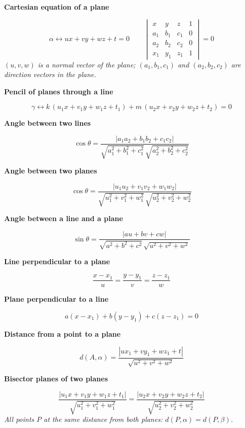 \documentclass[11pt]{article}
\newcommand{\sub}[1]{\par\medskip\textbf{#1}\par}
\newcommand{\expl}[1]{{\color{gray}\itshape #1}\par}
\begin{document}
\sub{Cartesian equation of a plane}
\[ \alpha \leftrightarrow ux + vy + wz + t = 0 \qquad \begin{vmatrix} x & y & z & 1 \\ a_1 & b_1 & c_1 & 0 \\ a_2 & b_2 & c_2 & 0 \\ x_1 & y_1 & z_1 & 1 \end{vmatrix} = 0 \]
\expl{$(u, v, w)$ is a normal vector of the plane; $(a_1, b_1, c_1)$ and $(a_2, b_2, c_2)$ are direction vectors in the plane.}

\sub{Pencil of planes through a line}
\[ \gamma \leftrightarrow k\,(u_1x + v_1y + w_1z + t_1) + m\,(u_2x + v_2y + w_2z + t_2) = 0 \]

\sub{Angle between two lines}
\[ \cos\theta = \frac{|a_1a_2 + b_1b_2 + c_1c_2|}{\sqrt{a_1^2 + b_1^2 + c_1^2}\,\sqrt{a_2^2 + b_2^2 + c_2^2}} \]

\sub{Angle between two planes}
\[ \cos\theta = \frac{|u_1u_2 + v_1v_2 + w_1w_2|}{\sqrt{u_1^2 + v_1^2 + w_1^2}\,\sqrt{u_2^2 + v_2^2 + w_2^2}} \]

\sub{Angle between a line and a plane}
\[ \sin\theta = \frac{|au + bv + cw|}{\sqrt{a^2 + b^2 + c^2}\,\sqrt{u^2 + v^2 + w^2}} \]

\sub{Line perpendicular to a plane}
\[ \frac{x - x_1}{u} = \frac{y - y_1}{v} = \frac{z - z_1}{w} \]

\sub{Plane perpendicular to a line}
\[ a(x - x_1) + b(y - y_1) + c(z - z_1) = 0 \]

\sub{Distance from a point to a plane}
\[ d(A, \alpha) = \frac{|ux_1 + vy_1 + wz_1 + t|}{\sqrt{u^2 + v^2 + w^2}} \]

\sub{Bisector planes of two planes}
\[ \frac{|u_1x + v_1y + w_1z + t_1|}{\sqrt{u_1^2 + v_1^2 + w_1^2}} = \frac{|u_2x + v_2y + w_2z + t_2|}{\sqrt{u_2^2 + v_2^2 + w_2^2}} \]
\expl{All points $P$ at the same distance from both planes: $d(P, \alpha) = d(P, \beta)$.}
\end{document}
